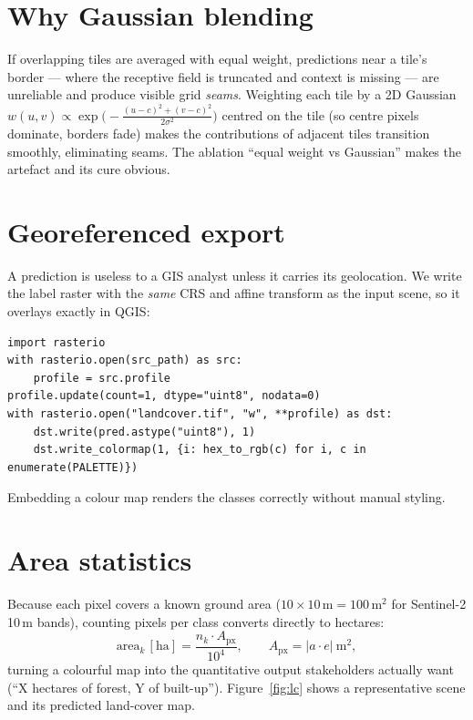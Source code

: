\section{Why Gaussian blending}

If overlapping tiles are averaged with equal weight, predictions near a tile's
border --- where the receptive field is truncated and context is missing --- are
unreliable and produce visible grid \emph{seams}. Weighting each tile by a 2D
Gaussian $w(u,v)\propto\exp\!\big(-\tfrac{(u-c)^2+(v-c)^2}{2\sigma^2}\big)$
centred on the tile (so centre pixels dominate, borders fade) makes the
contributions of adjacent tiles transition smoothly, eliminating seams. The
ablation ``equal weight vs Gaussian'' makes the artefact and its cure obvious.

\section{Georeferenced export}

A prediction is useless to a GIS analyst unless it carries its geolocation. We
write the label raster with the \emph{same} CRS and affine transform as the
input scene, so it overlays exactly in QGIS:
\begin{lstlisting}
import rasterio
with rasterio.open(src_path) as src:
    profile = src.profile
profile.update(count=1, dtype="uint8", nodata=0)
with rasterio.open("landcover.tif", "w", **profile) as dst:
    dst.write(pred.astype("uint8"), 1)
    dst.write_colormap(1, {i: hex_to_rgb(c) for i, c in enumerate(PALETTE)})
\end{lstlisting}
Embedding a colour map renders the classes correctly without manual styling.

\section{Area statistics}

Because each pixel covers a known ground area ($10\times10\,\mathrm{m}=100\,
\mathrm{m}^2$ for Sentinel-2 10\,m bands), counting pixels per class converts
directly to hectares:
\begin{equation}
\text{area}_k\,[\mathrm{ha}] = \frac{n_k \cdot A_\mathrm{px}}{10^4},
\qquad A_\mathrm{px}=|a\cdot e|\ \mathrm{m}^2,
\end{equation}
turning a colourful map into the quantitative output stakeholders actually want
(``X hectares of forest, Y of built-up''). Figure~\ref{fig:lc} shows a
representative scene and its predicted land-cover map.

